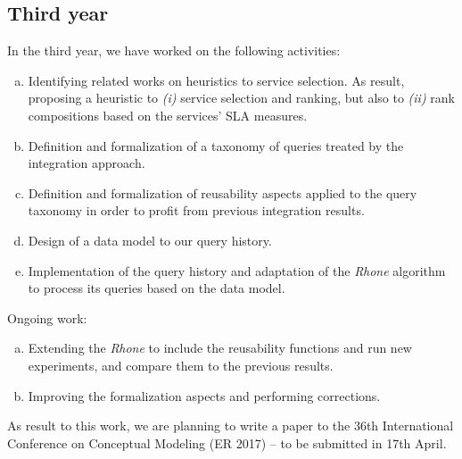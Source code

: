 
\subsection{Third year}

In the third year, we have worked on the following activities: 
\begin{enumerate} [a)]
\item Identifying related works on heuristics to service selection. As result, proposing a heuristic to \textit{(i)} service selection and ranking, but also to \textit{(ii)} rank compositions based on the services' SLA measures.
\item Definition and formalization of a taxonomy of queries treated by the integration approach.
\item Definition and formalization of reusability aspects applied to the query taxonomy in order to profit from previous integration results. 
\item Design of a data model to our query history.
\item Implementation of the query history and adaptation of the \textit{Rhone} algorithm to process its queries based on the data model.
\end{enumerate}

Ongoing work: 
\begin{enumerate} [a)]
\item Extending the \textit{Rhone} to include the reusability functions and run new experiments, and compare them to the previous results.
\item Improving the formalization aspects and performing corrections.
\end{enumerate}

As result to this work, we are planning to write a paper to the 36th International Conference on Conceptual Modeling (ER 2017) -- to be submitted in 17th April.
